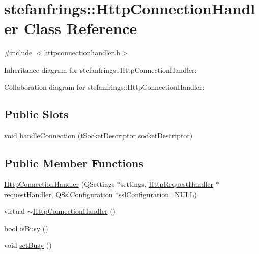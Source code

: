 \hypertarget{classstefanfrings_1_1_http_connection_handler}{}\section{stefanfrings\+:\+:Http\+Connection\+Handler Class Reference}
\label{classstefanfrings_1_1_http_connection_handler}


{\ttfamily \#include $<$httpconnectionhandler.\+h$>$}



Inheritance diagram for stefanfrings\+:\+:Http\+Connection\+Handler\+:


Collaboration diagram for stefanfrings\+:\+:Http\+Connection\+Handler\+:
\subsection*{Public Slots}
\begin{DoxyCompactItemize}
\item 
void \mbox{\hyperlink{classstefanfrings_1_1_http_connection_handler_ae431cfa4b0a866867f93436517200f1d}{handle\+Connection}} (\mbox{\hyperlink{httpconnectionhandler_8h_a9884f8c3364a6510f6118c5336fd0458}{t\+Socket\+Descriptor}} socket\+Descriptor)
\end{DoxyCompactItemize}
\subsection*{Public Member Functions}
\begin{DoxyCompactItemize}
\item 
\mbox{\hyperlink{classstefanfrings_1_1_http_connection_handler_a7d60c4a8f80eaeab436adba6e8d529d3}{Http\+Connection\+Handler}} (Q\+Settings $\ast$settings, \mbox{\hyperlink{classstefanfrings_1_1_http_request_handler}{Http\+Request\+Handler}} $\ast$request\+Handler, Q\+Ssl\+Configuration $\ast$ssl\+Configuration=N\+U\+LL)
\item 
virtual \mbox{\hyperlink{classstefanfrings_1_1_http_connection_handler_af47c5713b7e92040d59803bd7c99c9f5}{$\sim$\+Http\+Connection\+Handler}} ()
\item 
bool \mbox{\hyperlink{classstefanfrings_1_1_http_connection_handler_a3ce005483981faf3b1b5cabf1fe6c24f}{is\+Busy}} ()
\item 
void \mbox{\hyperlink{classstefanfrings_1_1_http_connection_handler_a7fcffe53d6604499fbb298bbc0fa453e}{set\+Busy}} ()
\end{DoxyCompactItemize}


